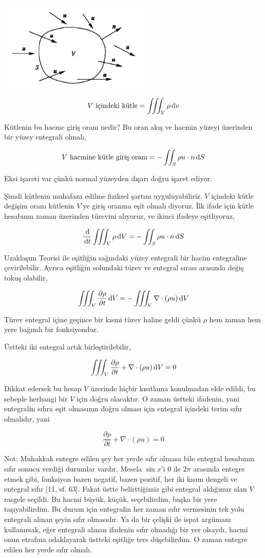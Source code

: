 \documentclass[12pt,fleqn]{article}\usepackage{../../common}
\begin{document}
\includegraphics[width=20em]{phy_050_cons_01.png}

$$
V \textrm{ içindeki kütle} = \iiint_V \rho \,\mathrm{d} v
$$

Kütlenin bu hacme giriş oranı nedir? Bu oran akış ve hacmin yüzeyi üzerinden bir
yüzey entegrali olmalı,

$$
V \textrm{ hacmine kütle giriş oranı} = - \iint_S \rho u \cdot n \,\mathrm{d} S
$$

Eksi işareti var çünkü normal yüzeyden dışarı doğru işaret ediyor.

Şimdi kütlenin muhafaza edilme fiziksel şartını uyguluyabiliriz. $V$ içindeki
kütle değişim oranı kütlenin $V$'ye giriş oranına eşit olmalı diyoruz. İlk ifade
için kütle hesabının zaman üzerinden türevini alıyoruz, ve ikinci ifadeye
eşitliyoruz,

$$
\frac{\,\mathrm{d}}{\,\mathrm{d} t}  \iiint_V \rho \,\mathrm{d} V = - \iint_S \rho u \cdot n \,\mathrm{d} S
$$

Uzaklaşım Teorisi ile eşitliğin sağındaki yüzey entegrali bir hacim entegraline
çevirilebilir. Ayrıca eşitliğin solundaki türev ve entegral sırası arasında
değiş tokuş olabilir,

$$
\iiint_V \frac{\partial \rho}{\partial t} \,\mathrm{d} V = - \iiint_V \nabla \cdot (\rho u ) \,\mathrm{d} V
$$

Türev entegral içine geçince bir kısmi türev haline geldi çünkü $\rho$ hem zaman
hem yere bağımlı bir fonksiyondur.

Üstteki iki entegral artık birleştirilebilir,

$$
\iiint_V \frac{\partial \rho}{\partial t} + \nabla \cdot (\rho u ) \,\mathrm{d} V = 0
$$

Dikkat edersek bu hesap $V$ üzerinde hiçbir kısıtlama konulmadan elde edildi,
bu sebeple herhangi bir $V$ için doğru olacaktır. O zaman üstteki ifadenin,
yani entegralin sıfıra eşit olmasının doğru olması için entegral içindeki
terim sıfır olmalıdır, yani 

$$
\frac{\partial \rho}{\partial t} + \nabla \cdot (\rho u ) = 0
$$

Not: Muhakkak entegre edilen şey her yerde sıfır olmasa bile entegral hesabının
sıfır sonucu verdiği durumlar vardır. Mesela $\sin x$'i 0 ile $2\pi$ arasında
entegre etmek gibi, fonksiyon bazen negatif, bazen pozitif, her iki kısım
dengeli ve entegral sıfır [11, sf. 63]. Fakat üstte belirttiğimiz gibi entegral
aldığımız alan $V$ rasgele seçildi. Bu hacmi büyük, küçük, seçebilirdim, başka
bir yere taşıyabilirdim. Bu durum için entegralin her zaman sıfır vermesinin tek
yolu entegrali alınan şeyin sıfır olmasıdır. Ya da bir çelişki ile ispat
argümanı kullanırsak, eğer entegrali alınan ifadenin sıfır olmadığı bir yer
olsaydı, hacmi onun etrafına odaklayarak üstteki eşitliğe ters düşebilirdim. O
zaman entegre edilen her yerde sıfır olmalı.
\end{document}
